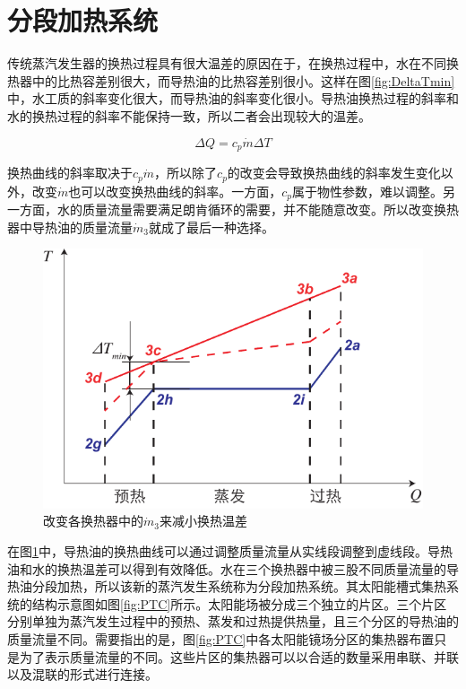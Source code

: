\section{分段加热系统}
\label{sec:melrs}

传统蒸汽发生器的换热过程具有很大温差的原因在于，在换热过程中，水在不同换热器中的比热容差别很大，而导热油的比热容差别很小。这样在图\ref{fig:DeltaTmin}中，水工质的斜率变化很大，而导热油的斜率变化很小。导热油换热过程的斜率和水的换热过程的斜率不能保持一致，所以二者会出现较大的温差。

\begin{equation}
  \Delta Q =  c_p\dot{m} \Delta T
\end{equation}

换热曲线的斜率取决于$c_p\dot{m}$，所以除了$c_p$的改变会导致换热曲线的斜率发生变化以外，改变$\dot{m}$也可以改变换热曲线的斜率。一方面，$c_p$属于物性参数，难以调整。另一方面，水的质量流量需要满足朗肯循环的需要，并不能随意改变。所以改变换热器中导热油的质量流量$\dot{m}_3$就成了最后一种选择。

\noindent \begin{figure}[htbp]
\begin{center}
	\includegraphics[width = 0.5\columnwidth]{fig/BetterCurve}
	\caption{改变各换热器中的$\dot{m}_3$来减小换热温差}
	\label{fig:BetterCurve}
\end{center}
\end{figure}

在图\ref{fig:BetterCurve}中，导热油的换热曲线可以通过调整质量流量从实线段调整到虚线段。导热油和水的换热温差可以得到有效降低。水在三个换热器中被三股不同质量流量的导热油分段加热，所以该新的蒸汽发生系统称为分段加热系统。其太阳能槽式集热系统的结构示意图如图\ref{fig:PTC}所示。太阳能场被分成三个独立的片区。三个片区分别单独为蒸汽发生过程中的预热、蒸发和过热提供热量，且三个分区的导热油的质量流量不同。需要指出的是，图\ref{fig:PTC}中各太阳能镜场分区的集热器布置只是为了表示质量流量的不同。这些片区的集热器可以以合适的数量采用串联、并联以及混联的形式进行连接。

